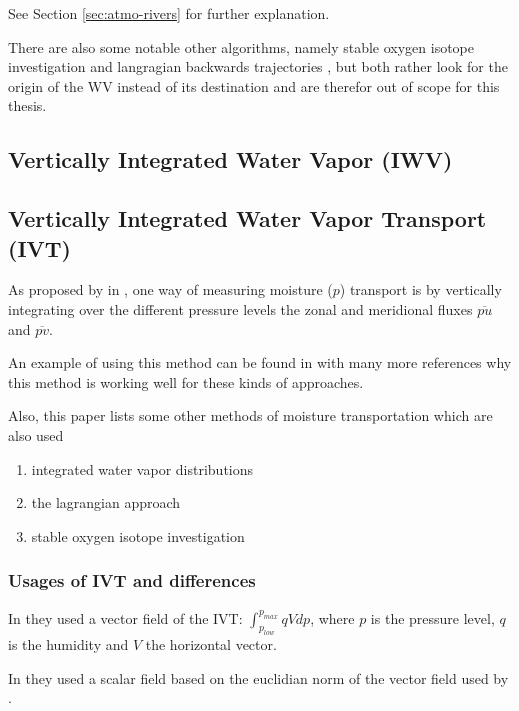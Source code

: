 See Section \ref{sec:atmo-rivers} for further explanation. 


There are also some notable other algorithms, namely stable oxygen isotope investigation \cite{ma_atmospheric_nodate} and langragian backwards trajectories \cite{zhao_lagrangian_2021}, but both rather look for the origin of the WV instead of its destination and are therefor out of scope for this thesis.

\subsection{Vertically Integrated Water Vapor (IWV)}

\subsection{Vertically Integrated Water Vapor Transport (IVT)}

As proposed by \citeauthor{zhu_proposed_1998} in \cite{zhu_proposed_1998}, one way of measuring moisture ($p$) transport is by vertically integrating over the different pressure levels the zonal and meridional fluxes $\overline{pu}$ and $\overline{pv}$. 

An example of using this method can be found in \cite{ayantobo_integrated_2022} with many more references why this method is working well for these kinds of approaches. 

Also, this paper lists some other methods of moisture transportation which are also used

\begin{enumerate}
  \item integrated water vapor distributions
  \item the lagrangian approach
  \item stable oxygen isotope investigation
\end{enumerate}

\subsubsection{Usages of IVT and differences}

In \cite{ralph_dropsonde_2017} they used a vector field of the IVT: $\int_{p_{low}}^{p_{max}} qV dp$, where $p$ is the pressure level, $q$ is the humidity and $V$ the horizontal vector.

In \cite{sousa_north_2020} they used a scalar field based on the euclidian norm of the vector field used by \cite{ralph_dropsonde_2017}.


